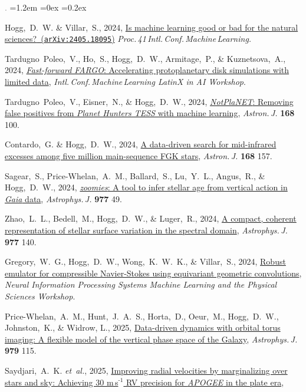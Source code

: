 \documentclass[10pt,letterpaper]{article}
\newcommand{\foreign}[1]{\textsl{#1}}
\newcommand{\etal}{\foreign{et~al.}}
\newcommand{\project}[1]{\textsl{#1}}
\newcommand{\doi}[2]{\href{http://dx.doi.org/#1}{{#2}}}
\newcommand{\arxiv}[2]{\href{http://arxiv.org/abs/#1}{{#2}\ (\texttt{arXiv:#1})}}
\newcommand{\deemph}[1]{\textcolor{grey}{\footnotesize{#1}}}
\newcommand{\pubnumber}[1]{\deemph{{#1}.}}
\newcounter{refpubnum}
\newcommand{\hogglist}{%
    \rightmargin=0in
    \leftmargin=1.2em
    \topsep=0ex
    \partopsep=0pt
    \itemsep=0.2ex
    \parsep=0pt
    \itemindent=-1.0\leftmargin
    \listparindent=0.0\leftmargin
    \settowidth{\labelsep}{~}
    \usecounter{refpubnum}
  }
\begin{document}
\begin{list}{\pubnumber{\therefpubnum}}{\hogglist}
\item
  Hogg,~D.~W. \& Villar,~S., 2024,
  \arxiv{2405.18095}{Is machine learning good or bad for the natural sciences?}
  \textit{Proc.\,41\,Intl.\,Conf.\,Machine\,Learning.}
\item
  Tardugno~Poleo,~V., Ho,~S., Hogg,~D.~W., Armitage,~P., \& Kuznetsova,~A., 2024,
  \href{https://openreview.net/pdf?id=TngdxtwFIn}{\project{Fast-forward FARGO}: Accelerating protoplanetary disk simulations with limited data},
  \textit{Intl.\,Conf.\,Machine\,Learning LatinX in AI Workshop}.
\item
  Tardugno~Poleo,~V., Eisner,~N., \& Hogg,~D.~W., 2024,
  \doi{10.3847/1538-3881/ad5f29}{\project{NotPlaNET}: Removing false positives from \project{Planet Hunters TESS} with machine learning},
  \textit{Astron.\,J.} \textbf{168} 100.
\item Contardo,~G. \& Hogg,~D.~W., 2024,
  \doi{10.3847/1538-3881/ad6b90}{A data-driven search for mid-infrared excesses among five million main-sequence FGK stars},
  \textit{Astron.\,J.} \textbf{168} 157.
\item Sagear,~S., Price-Whelan,~A.~M., Ballard,~S., Lu,~Y.~L., Angus,~R., \& Hogg,~D.~W., 2024,
  \doi{10.3847/1538-4357/ad8b26}{\project{zoomies}: A tool to infer stellar age from vertical action in \project{Gaia} data},
  \textit{Astrophys.\,J.} \textbf{977} 49.
\item Zhao,~L.~L., Bedell,~M., Hogg,~D.~W., \& Luger,~R., 2024,
  \doi{10.3847/1538-4357/ad90ad}{A compact, coherent representation of stellar surface variation in the spectral domain},
  \textit{Astrophys.\,J.} \textbf{977} 140.
\item Gregory,~W.~G., Hogg,~D.~W., Wong,~K.~W.~K., \& Villar,~S., 2024,
  \href{https://ml4physicalsciences.github.io/2024/files/NeurIPS_ML4PS_2024_176.pdf}{Robust emulator for compressible Navier-Stokes using equivariant geometric convolutions},
  \textit{Neural Information Processing Systems Machine Learning and the Physical Sciences Workshop}.
\item Price-Whelan,~A.~M., Hunt,~J.~A.~S., Horta,~D., Oeur,~M., Hogg,~D.~W., Johnston,~K., \& Widrow, L., 2025,
  \doi{10.3847/1538-4357/ad969a}{Data-driven dynamics with orbital torus imaging: A flexible model of the vertical phase space of the Galaxy},
  \textit{Astrophys.\,J.} \textbf{979} 115.
\item Saydjari,~A.~K. \etal, 2025,
  \doi{10.3847/1538-3881/adb02d}{Improving radial velocities by marginalizing over stars and sky: Achieving 30 m\,s$^{‑1}$ RV precision for \project{APOGEE} in the plate era},

\end{list}
\end{document}
